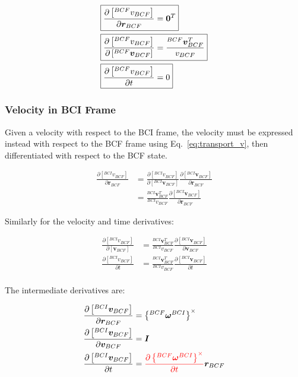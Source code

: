 \documentclass[]{article}
\newcommand{\vb}[1]{\bm{#1}} %
\newcommand{\pd}[2]{\frac{\partial #1}{\partial #2}} %
\begin{document}
\begin{align}
	\Aboxed{\pd{\left[ ^{BCF} v_{BCF} \right]}{\vb{r}_{BCF}} &= \vb{0}^T} \\
	\Aboxed{\pd{\left[ ^{BCF} v_{BCF} \right]}{\left[ ^{BCF} \vb{v}_{BCF} \right]} &= \frac{^{BCF} \vb{v}_{BCF}^T}{v_{BCF}}} \\
	\Aboxed{\pd{\left[ ^{BCF} v_{BCF} \right]}{t} &= 0}
\end{align}

\subsubsection{Velocity in BCI Frame}
\label{sec:v_bci}

Given a velocity with respect to the BCI frame, the velocity must be expressed instead with respect to the BCF frame using Eq.~\eqref{eq:transport_v}, then differentiated with respect to the BCF state.

\begin{align}
	\pd{\left[ ^{BCI} v_{BCF} \right]}{\vb{r}_{BCF}} &= \pd{\left[ ^{BCI} v_{BCF} \right]}{\left[ ^{BCI} \vb{v}_{BCF} \right]} \pd{\left[ ^{BCI} \vb{v}_{BCF} \right]}{\vb{r}_{BCF}} \\
	&= \frac{^{BCI} \vb{v}_{BCF}^T}{^{BCI} v_{BCF}} \pd{\left[ ^{BCI} \vb{v}_{BCF} \right]}{\vb{r}_{BCF}}
\end{align}

Similarly for the velocity and time derivatives:

\begin{align}
	\pd{\left[ ^{BCI} v_{BCF} \right]}{\left[\vb{v}_{BCF} \right]} &= \frac{^{BCI} \vb{v}_{BCF}^T}{^{BCI} v_{BCF}} \pd{\left[ ^{BCI} \vb{v}_{BCF} \right]}{\vb{v}_{BCF}} \\
	\pd{\left[ ^{BCI} v_{BCF} \right]}{t} &=  \frac{^{BCI} \vb{v}_{BCF}^T}{^{BCI} v_{BCF}} \pd{\left[ ^{BCI} \vb{v}_{BCF} \right]}{t} \\
\end{align}

The intermediate derivatives are:

\begin{align}
	\pd{\left[ ^{BCI} \vb{v}_{BCF} \right]}{\vb{r}_{BCF}} &= \left\{ ^{BCF} \vb{\omega}^{BCI} \right\}^{\times} \\
	\pd{\left[ ^{BCI} \vb{v}_{BCF} \right]}{\vb{v}_{BCF}} &= \vb{I} \\
	\pd{\left[ ^{BCI} \vb{v}_{BCF} \right]}{t} &= {\color{red} \pd{\left\{ ^{BCF} \vb{\omega}^{BCI} \right\}^{\times}}{t}} \vb{r}_{BCF}
\end{align}
\end{document}
